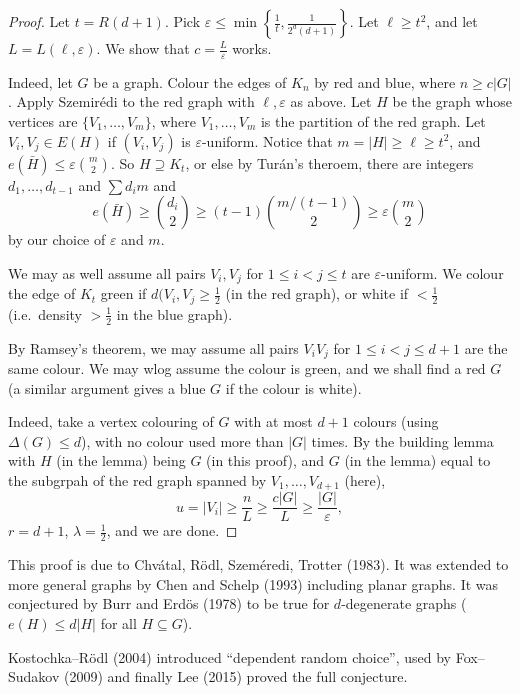 \documentclass[a4paper]{article}
\begin{document}
\begin{proof}
  Let $t = R(d + 1)$. Pick $\varepsilon \leq \min \left\{\frac{1}{t}, \frac{1}{2^d (d + 1)}\right\}$. Let $\ell \geq t^2$, and let $L = L(\ell, \varepsilon)$. We show that $c = \frac{L}{\varepsilon}$ works.

  Indeed, let $G$ be a graph. Colour the edges of $K_n$ by red and blue, where $n \geq c |G|$. Apply Szemir\'edi to the red graph with $\ell, \varepsilon$ as above. Let $H$ be the graph whose vertices are $\{V_1, \ldots, V_m\}$, where $V_1, \ldots, V_m$ is the partition of the red graph. Let $V_i, V_j \in E(H)$ if $(V_i, V_j)$ is $\varepsilon$-uniform. Notice that $m = |H| \geq \ell \geq t^2$, and $e(\bar{H}) \leq \varepsilon \binom{m}{2}$. So $H \supseteq K_t$, or else by Tur\'an's theroem, there are integers $d_1, \ldots, d_{t - 1}$ and $\sum d_i m$ and
  \[
    e(\bar{H}) \geq \binom{d_i}{2}\geq (t - 1) \binom{m/(t - 1)}{2} \geq \varepsilon \binom{m}{2}
  \]
  by our choice of $\varepsilon$ and $m$.

  We may as well assume all pairs $V_i, V_j$ for $1 \leq i < j \leq t$ are $\varepsilon$-uniform. We colour the edge of $K_t$ green if $d(V_i, V_j \geq \frac{1}{2}$ (in the red graph), or white if $< \frac{1}{2}$ (i.e.\ density $> \frac{1}{2}$ in the blue graph).

  By Ramsey's theorem, we may assume all pairs $V_i V_j$ for $1 \leq i < j \leq d + 1$ are the same colour. We may wlog assume the colour is green, and we shall find a red $G$ (a similar argument gives a blue $G$ if the colour is white).

  Indeed, take a vertex colouring of $G$ with at most $d + 1$ colours (using $\Delta(G) \leq d$), with no colour used more than $|G|$ times. By the building lemma with $H$ (in the lemma) being $G$ (in this proof), and $G$ (in the lemma) equal to the subgrpah of the red graph spanned by $V_1, \ldots, V_{d + 1}$ (here),
  \[
    u = |V_i| \geq \frac{n}{L} \geq \frac{c |G|}{L} \geq \frac{|G|}{\varepsilon},
  \]
  $r = d + 1$, $\lambda = \frac{1}{2}$, and we are done.
\end{proof}

This proof is due to Chv\'atal, R\"odl, Szem\'eredi, Trotter (1983). It was extended to more general graphs by Chen and Schelp (1993) including planar graphs. It was conjectured by Burr and Erd\"os (1978) to be true for $d$-degenerate graphs ($e(H) \leq d |H|$ for all $H \subseteq G$).

Kostochka--R\"odl (2004) introduced ``dependent random choice'', used by Fox--Sudakov (2009) and finally Lee (2015) proved the full conjecture.
\end{document}
